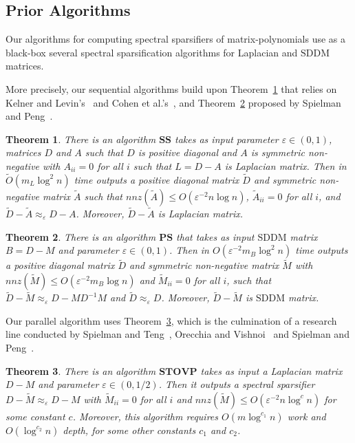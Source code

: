 \documentclass[11pt]{article}
\newcommand{\SDDM}{\mathrm{SDDM}}
\newcommand{\iSS}{\mathrm{\mathbf{SS}}}
\newcommand{\PS}{\mathbf{PS}}
\newcommand{\STOVP}{\mathbf{STOVP}}
\newcommand{\wD}{\widetilde{D}}
\newcommand{\wA}{\widetilde{A}}
\newcommand{\wM}{\widetilde{M}}
\newcommand{\wO}{\widetilde{O}}
\newcommand{\Di}{D^{-1}}
\newcommand{\eps}{\epsilon}
\renewcommand{\leq}{\leqslant}
\renewcommand{\eps}{\varepsilon}
\newtheorem{thm}{Theorem}  \newtheorem{fact}[thm]{Fact}
\numberwithin{thm}{section}
\begin{document}
\subsection{Prior Algorithms}

Our algorithms for computing spectral sparsifiers of matrix-polynomials use as a black-box several spectral sparsification algorithms for Laplacian and $\SDDM$ matrices.

More precisely, our sequential algorithms build upon Theorem~\ref{thm_KL13} that relies on Kelner and Levin's~\cite[Theorem 3]{KL13} and Cohen et al.'s~\cite[Lemma 4]{CLMMPS15}, and Theorem~\ref{thm_PS14} proposed by Spielman and Peng~\cite[Corollary 6.4]{PS14}.

\begin{thm}\label{thm_KL13}\cite{KL13}
There is an algorithm $\iSS$ takes
as input parameter $\eps\in(0,1)$, matrices $D$ and $A$ such that $D$ is positive diagonal and $A$ is symmetric non-negative with $A_{ii}=0$ for all $i$ such that $L=D-A$ is Laplacian matrix. Then in $\wO(m_{L}\log^{2}n)$ time outputs a positive diagonal matrix $\wD$ and symmetric non-negative matrix $\wA$ such that $nnz(\wA)\leq O(\eps^{-2}n\log n)$,
$\wA_{ii}=0$ for all $i$, and $\wD-\wA\approx_{\eps}D-A$. Moreover, $\wD-\wA$ is Laplacian matrix.
\end{thm}

\begin{thm}\label{thm_PS14}\cite{PS14}
There is an algorithm $\PS$ that takes
as input $\SDDM$ matrix $B=D-M$ and parameter $\eps\in(0,1)$.
Then in $O(\eps^{-2}m_{B}\log^{2}n)$ time outputs
a positive diagonal matrix $\wD$ and symmetric non-negative
matrix $\wM$ with $nnz(\wM)\leq O(\eps^{-2}m_{B}\log n)$
and $\wM_{ii}=0$ for all $i$, such that $\wD-\wM\approx_{\eps}D-M\Di M$ and $\wD\approx_{\eps}D$. Moreover, $\wD-\wM$ is $\SDDM$ matrix.
\end{thm}

Our parallel algorithm uses Theorem~\ref{thm_ParallelLaplacianSS}, which is the culmination of a research line conducted by Spielman and Teng~\cite{ST11}, Orecchia and Vishnoi~\cite{OV11} and Spielman and Peng~\cite{PS14}.

\begin{thm}\label{thm_ParallelLaplacianSS}\cite{PS14}
There is an algorithm $\STOVP$ takes as input a Laplacian matrix $D-M$ and parameter $\eps\in(0,1/2)$. Then it outputs a spectral sparsifier $D-\wM\approx_{\eps}D-M$ with $\wM_{ii}=0$ for all $i$ and $nnz(\wM)\leq O(\eps^{-2}n\log^{c}n)$ for some constant $c$. Moreover, this algorithm requires $O(m\log^{c_1}n)$ work and $O(\log^{c_2}n)$ depth, for some other constants $c_1$ and $c_2$.
\end{thm}
\end{document}
